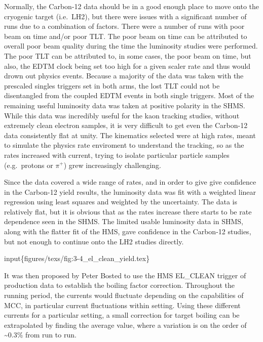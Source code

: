 \documentclass[
]{report}
\begin{document}
Normally, the Carbon-12 data should be in a good enough place to move
onto the cryogenic target (i.e.~LH2), but there were issues with a
significant number of runs due to a combination of factors. There were a
number of runs with poor beam on time and/or poor TLT. The poor beam on
time can be attributed to overall poor beam quality during the time the
luminosity studies were performed. The poor TLT can be attributed to, in
some cases, the poor beam on time, but also, the EDTM clock being set
too high for a given scaler rate and thus would drown out physics
events. Because a majority of the data was taken with the prescaled
singles triggers set in both arms, the lost TLT could not be
disentangled from the coupled EDTM events in both single triggers. Most
of the remaining useful luminosity data was taken at positive polarity
in the SHMS. While this data was incredibly useful for the kaon tracking
studies, without extremely clean electron samples, it is very difficult
to get even the Carbon-12 data consistently flat at unity. The
kinematics selected were at high rates, meant to simulate the physics
rate enviroment to understand the tracking, so as the rates increased
with current, trying to isolate particular particle samples
(e.g.~protons or \(\pi^+\)) grew increasingly challenging.




Since the data covered a wide range of rates, and in order to give give
confidence in the Carbon-12 yield results, the luminosity data was fit
with a weighted linear regression using least squares and weighted by
the uncertainty. The data is relatively flat, but it is obvious that as
the rates increase there starts to be rate dependence seen in the SHMS.
The limited usable luminosity data in SHMS, along with the flatter fit
of the HMS, gave confidence in the Carbon-12 studies, but not enough to
continue onto the LH2 studies directly.

input\{figures/texs/fig:3-4\_el\_clean\_yield.tex\}

It was then proposed by Peter Bosted to use the HMS EL\_CLEAN trigger of
production data to establish the boiling factor correction. Throughout
the running period, the currents would fluctuate depending on the
capabilities of MCC, in particular current fluctuations within setting.
Using these different currents for a particular setting, a small
correction for target boiling can be extrapolated by finding the average
value, where a variation is on the order of \textasciitilde0.3\% from
run to run.
\end{document}
